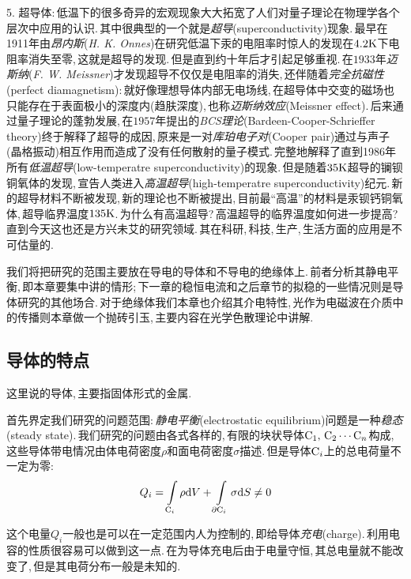 	\vspace{0.3cm} 5. 超导体:\,低温下的很多奇异的宏观现象大大拓宽了人们对量子理论在物理学各个层次中应用的认识.\,其中很典型的一个就是\emph{超导}(superconductivity)现象.\,最早在1911年由\emph{昂内斯}({\it H. K. Onnes})在研究低温下汞的电阻率时惊人的发现在$4.2{\rm K}$下电阻率消失至零,\,这就是超导的发现.\,但是直到约十年后才引起足够重视.\,在$1933$年\emph{迈斯纳}({\it F. W. Meissner})才发现超导不仅仅是电阻率的消失,\,还伴随着\emph{完全抗磁性}(perfect diamagnetism):\,就好像理想导体内部无电场线,\,在超导体中交变的磁场也只能存在于表面极小的深度内(趋肤深度),\,也称\emph{迈斯纳效应}(Meissner effect).\,后来通过量子理论的蓬勃发展,\,在$1957$年提出的\emph{BCS理论}(Bardeen-Cooper-Schrieffer theory)终于解释了超导的成因,\,原来是一对\emph{库珀电子对}(Cooper pair)通过与声子(晶格振动)相互作用而造成了没有任何散射的量子模式.\,完整地解释了直到1986年所有\emph{低温超导}(low-temperatre superconductivity)的现象.\,但是随着$35{\rm K}$超导的镧钡铜氧体的发现,\,宣告人类进入\emph{高温超导}(high-temperatre superconductivity)纪元.\,新的超导材料不断被发现,\,新的理论也不断被提出,\,目前最``高温''的材料是汞钡钙铜氧体,\,超导临界温度$135{\rm K}$.\,为什么有高温超导?\,高温超导的临界温度如何进一步提高?\,直到今天这也还是方兴未艾的研究领域.\,其在科研,\,科技,\,生产,\,生活方面的应用是不可估量的.

\vspace{0.5cm}

我们将把研究的范围主要放在导电的导体和不导电的绝缘体上.\,前者分析其静电平衡,\,即本章要集中讲的情形;\,下一章的稳恒电流和之后章节的拟稳的一些情况则是导体研究的其他场合.\,对于绝缘体我们本章也介绍其介电特性,\,光作为电磁波在介质中的传播则本章做一个抛砖引玉,\,主要内容在光学色散理论中讲解.

\subsection{导体的特点}

这里说的导体,\,主要指固体形式的金属.

首先界定我们研究的问题范围:\,\emph{静电平衡}(electrostatic equilibrium)问题是一种\emph{稳态}(steady state).\,我们研究的问题由各式各样的,\,有限的块状导体${\rm C}_1,\,{\rm C}_2\cdots {\rm C}_n$构成,\,这些导体带电情况由体电荷密度$\rho$和面电荷密度$\sigma$描述.\,但是导体${\rm C}_i$上的总电荷量不一定为零:
\[Q_i=\int\limits_{{\rm C}_i}\rho \textrm{d} V+\int\limits_{\partial{\rm C}_i}\sigma \textrm{d} S\neq 0\]

这个电量$Q_i$一般也是可以在一定范围内人为控制的,\,即给导体\emph{充电}(charge).\,利用电容的性质很容易可以做到这一点.\,在为导体充电后由于电量守恒,\,其总电量就不能改变了,\,但是其电荷分布一般是未知的.


